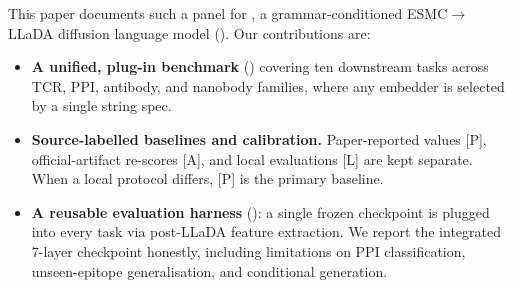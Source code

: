 This paper documents such a panel for \Ours{}, a grammar-conditioned
ESMC$\rightarrow$LLaDA diffusion language model (). Our
contributions are:
\begin{itemize}
  \item \textbf{A unified, plug-in benchmark} () covering ten
  downstream tasks across TCR, PPI, antibody, and nanobody families, where any
  embedder is selected by a single string spec.
  \item \textbf{Source-labelled baselines and calibration.} Paper-reported
  values [P], official-artifact re-scores [A], and local evaluations [L] are
  kept separate. When a local protocol differs, [P] is the primary baseline.
  \item \textbf{A reusable evaluation harness} (): a single
  frozen checkpoint is plugged into every task via post-LLaDA feature extraction.
  We report the integrated 7-layer checkpoint honestly, including limitations on
  PPI classification, unseen-epitope generalisation, and conditional generation.
\end{itemize}
